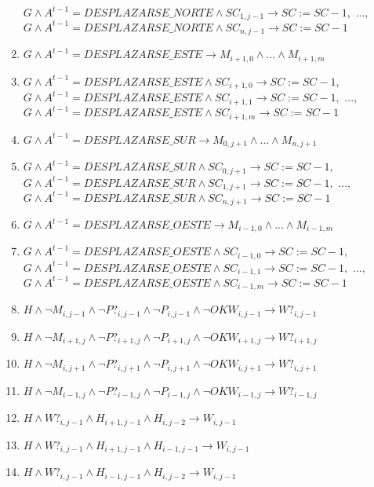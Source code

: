 \begin{enumerate}
    $G \land A^{t-1} = DESPLAZARSE\_NORTE \land SC_{1, j-1} \longrightarrow SC := SC - 1,$ \newline
    $...,$ \newline
    $G \land A^{t-1} = DESPLAZARSE\_NORTE \land SC_{n, j-1} \longrightarrow SC := SC - 1$
    \item $G \land A^{t-1} = DESPLAZARSE\_ESTE \longrightarrow M_{i+1, 0} \land ... \land M_{i+1, m}$
    \item $G \land A^{t-1} = DESPLAZARSE\_ESTE \land SC_{i+1, 0} \longrightarrow SC := SC - 1,$ \newline
    $G \land A^{t-1} = DESPLAZARSE\_ESTE \land SC_{i+1, 1} \longrightarrow SC := SC - 1,$ \newline
    $...,$ \newline
    $G \land A^{t-1} = DESPLAZARSE\_ESTE \land SC_{i+1,m} \longrightarrow SC := SC - 1$
    \item $G \land A^{t-1} = DESPLAZARSE\_SUR \longrightarrow M_{0, j+1} \land ... \land M_{n, j+1}$
    \item $G \land A^{t-1} = DESPLAZARSE\_SUR \land SC_{0, j+1} \longrightarrow SC := SC - 1,$ \newline
    $G \land A^{t-1} = DESPLAZARSE\_SUR \land SC_{1, j+1} \longrightarrow SC := SC - 1,$ \newline
    $...,$ \newline
    $G \land A^{t-1} = DESPLAZARSE\_SUR \land SC_{n, j+1} \longrightarrow SC := SC - 1$
    \item $G \land A^{t-1} = DESPLAZARSE\_OESTE \longrightarrow M_{i-1, 0} \land ... \land M_{i-1, m}$
    \item $G \land A^{t-1} = DESPLAZARSE\_OESTE \land SC_{i-1, 0} \longrightarrow SC := SC - 1,$ \newline
    $G \land A^{t-1} = DESPLAZARSE\_OESTE \land SC_{i-1, 1} \longrightarrow SC := SC - 1,$ \newline
    $...,$ \newline
    $G \land A^{t-1} = DESPLAZARSE\_OESTE \land SC_{i-1,m} \longrightarrow SC := SC - 1$
    \item $H \land \neg M_{i, j-1} \land \neg P?_{i, j-1} \land \neg P_{i, j-1} \land \neg OKW_{i, j-1} \longrightarrow W?_{i, j-1}$
    \item $H \land \neg M_{i+1, j} \land \neg P?_{i+1, j} \land \neg P_{i+1, j} \land \neg OKW_{i+1, j} \longrightarrow W?_{i+1, j}$
    \item $H \land \neg M_{i, j+1} \land \neg P?_{i, j+1} \land \neg P_{i, j+1} \land \neg OKW_{i, j+1} \longrightarrow W?_{i, j+1}$
    \item $H \land \neg M_{i-1, j} \land \neg P?_{i-1, j} \land \neg P_{i-1, j} \land \neg OKW_{i-1, j} \longrightarrow W?_{i-1, j}$
    \item $H \land W?_{i, j-1} \land H_{i+1, j-1} \land H_{i, j-2} \longrightarrow W_{i, j-1}$
    \item $H \land W?_{i, j-1} \land H_{i+1, j-1} \land H_{i-1, j-1} \longrightarrow W_{i, j-1}$
    \item $H \land W?_{i, j-1} \land H_{i-1, j-1} \land H_{i, j-2} \longrightarrow W_{i, j-1}$
    

\end{enumerate}
